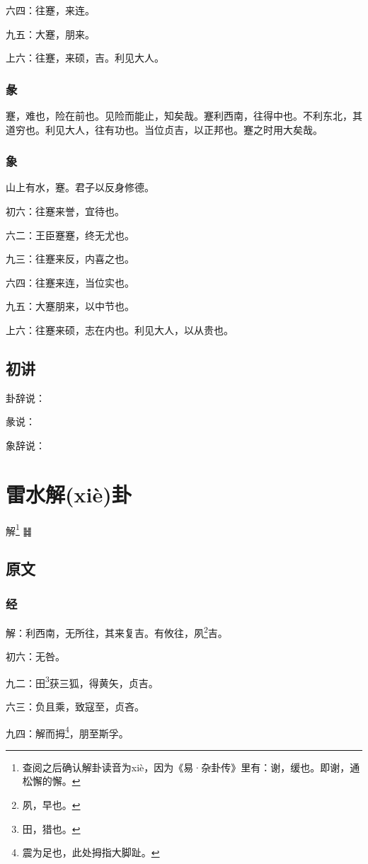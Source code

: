 \documentclass[12pt,oneside]{book}
\begin{document}
六四：往蹇，来连。

九五：大蹇，朋来。

上六：往蹇，来硕，吉。利见大人。

\subsection{彖}
蹇，难也，险在前也。见险而能止，知矣哉。蹇利西南，往得中也。不利东北，其道穷也。利见大人，往有功也。当位贞吉，以正邦也。蹇之时用大矣哉。

\subsection{象}
山上有水，蹇。君子以反身修德。

初六：往蹇来誉，宜待也。

六二：王臣蹇蹇，终无尤也。

九三：往蹇来反，内喜之也。

六四：往蹇来连，当位实也。

九五：大蹇朋来，以中节也。

上六：往蹇来硕，志在内也。利见大人，以从贵也。

\section{初讲}
卦辞说：

彖说：

象辞说：

\chapter{雷水解(xiè)卦}
解\footnote{查阅之后确认解卦读音为xiè，因为《易·杂卦传》里有：谢，缓也。即谢，通松懈的懈。} {\Large ䷧}

\section{原文}

\subsection{经}
解：利西南，无所往，其来复吉。有攸往，夙\footnote{夙，早也。}吉。

初六：无咎。

九二：田\footnote{田，猎也。}获三狐，得黄矢，贞吉。

六三：负且乘，致寇至，贞吝。

九四：解而拇\footnote{震为足也，此处拇指大脚趾。}，朋至斯孚。
\end{document}
